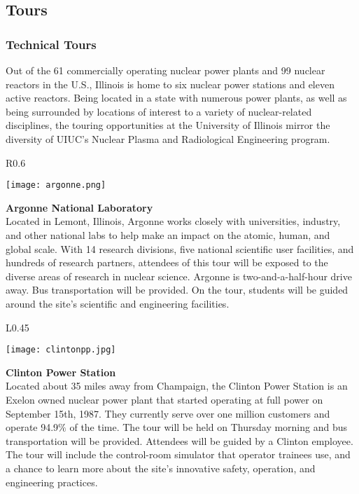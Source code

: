 \subsection{Tours}


\subsubsection{Technical Tours}
Out of the 61 commercially operating nuclear power plants and 99 nuclear reactors in the U.S., Illinois is home to six nuclear power stations and eleven active reactors. Being located in a state with numerous power plants, as well as being surrounded by locations of interest to a variety of nuclear-related disciplines, the touring opportunities at the University of Illinois mirror the diversity of UIUC’s Nuclear Plasma and Radiological Engineering program.\\

\clearpage
\setlength\intextsep{0pt}
\begin{wrapfigure}{R}{0.6\textwidth}
	\begin{center}
		\texttt{[image: argonne.png]}
	\end{center}
\end{wrapfigure}
\textbf{Argonne National Laboratory}\\
Located in Lemont, Illinois, Argonne works closely with universities, industry, and other national labs to help make an impact on the atomic, human, and global scale. With 14 research divisions, five national scientific user facilities, and hundreds of research partners, attendees of this tour will be exposed to the diverse areas of research in nuclear science. Argonne is two-and-a-half-hour drive away. Bus transportation will be provided. On the tour, students will be guided around the site’s scientific and engineering facilities.\\

\setlength\intextsep{0pt}
\begin{wrapfigure}{L}{0.45\textwidth}
	\begin{center}
		\texttt{[image: clintonpp.jpg]}
	\end{center}
\end{wrapfigure}
\textbf{Clinton Power Station}\\
Located about 35 miles away from Champaign, the Clinton Power Station is an Exelon owned nuclear power plant that started operating at full power on September 15th, 1987. They currently serve over one million customers and operate 94.9$\%$ of the time. The tour will be held on Thursday morning and bus transportation will be provided. Attendees will be guided by a Clinton employee. The tour will include the control-room simulator that operator trainees use, and a chance to learn more about the site’s innovative safety, operation, and engineering practices.\\

